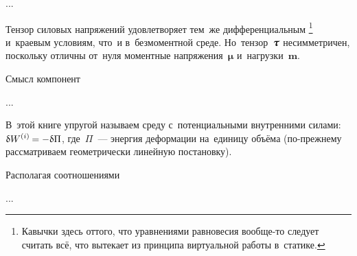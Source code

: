 \begin{otherlanguage}{russian}
...

Тензор силовых напряжений удовлетворяет тем~же дифференциальным \footnote{Кавычки здесь оттого, что уравнениями равновесия вообще\hbox{-}то следует считать всё, что вытекает из принципа виртуальной работы в~статике.} \hspace{-0.5em} и~краевым условиям, что~и в~безмоментной среде. Но~тензор~$\mathboldtau$ несимметричен, поскольку отличны от~нуля моментные напряжения~$\bm{\mu}$ и~нагрузки~$\bm{m}$.

Смысл компонент

...






В~этой книге упругой называем среду с~потенциальными внутренними силами: ${\variation{\internalwork} = -\variation{\Pi}}$, где~$\Pi$~--- энергия деформации на~единицу объёма (по\hbox{-}прежнему рассматриваем геометрически линейную постановку).

Располагая соотношениями

...


\end{otherlanguage}
